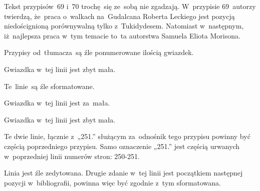 \documentclass[a4paper,11pt]{article}
\begin{document}
\start {} Tekst przypisów~69 i~70 trochę~się ze~sobą nie
zgadzają. W~przypisie 69~autorzy twierdzą, że~praca o~walkach
na~Gudalcana Roberta Leckiego jest pozycją niedoścignioną porównywalną
tylko z~Tukidydesem. Natomiast w~następnym, iż~najlepsza praca w~tym
temacie to~ta autorstwa Samuela Eliota Morisona.

\vspace{\spaceFour}


\start {} Przypisy od~tłumacza~są źle ponumerowane ilością
gwiazdek.

\vspace{\spaceFour}


\start {} Gwiazdka w~tej linii jest zbyt mała.

\vspace{\spaceFour}


\start {} Te~linie~są źle sformatowane.

\vspace{\spaceFour}


\start {} Gwiazdka w~tej linii jest za~mała.

\vspace{\spaceFour}


\start {} Gwiazdka w~tej linii jest zbyt mała.

\vspace{\spaceFour}


\start {} Te dwie linie, łącznie z~„251.” służącym
za~odnośnik tego przypisu powinny być częścią poprzedniego przypisu.
Samo oznaczenie „251.” jest częścią urwanych w~poprzedniej linii
numerów stron: 250-251.

\vspace{\spaceFour}


\start {} Linia jest źle zedytowana. Drugie zdanie w~tej
linii jest początkiem następnej pozycji w~bibliografii, powinna więc
być zgodnie z~tym sformatowana.

\vspace{\spaceFour}





\newpage

\end{document}

